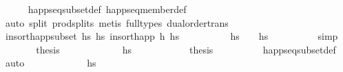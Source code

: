 \begin{isabellebody}
%
\isadelimproof
\ \ \ \ %
\endisadelimproof
%
\isatagproof
{}\isamarkupfalse%
\ happ{\isacharunderscore}{\kern0pt}seq{\isacharunderscore}{\kern0pt}subset{\isacharunderscore}{\kern0pt}def\ happ{\isacharunderscore}{\kern0pt}seq{\isacharunderscore}{\kern0pt}member{\isacharunderscore}{\kern0pt}def\isanewline
\ \ \ \ \isamarkupfalse%
\ {\isacharparenleft}{\kern0pt}auto\ split{\isacharcolon}{\kern0pt}\ prod{\isachardot}{\kern0pt}splits{\isacharparenright}{\kern0pt}\ {\isacharparenleft}{\kern0pt}metis\ {\isacharparenleft}{\kern0pt}full{\isacharunderscore}{\kern0pt}types{\isacharparenright}{\kern0pt}\ dual{\isacharunderscore}{\kern0pt}order{\isachardot}{\kern0pt}trans{\isacharparenright}{\kern0pt}%
\endisatagproof
{\isafoldproof}%
%
\isadelimproof
\isanewline
%
\endisadelimproof
\isanewline
\ \ \isamarkupfalse%
\ insort{\isacharunderscore}{\kern0pt}happ{\isacharunderscore}{\kern0pt}subset{\isacharcolon}{\kern0pt}\ {\isachardoublequoteopen}hs\ {\isasymsubseteq}\isactrlsub h\isactrlsub s\ insort{\isacharunderscore}{\kern0pt}happ\ h\ hs{\isachardoublequoteclose}\isanewline
%
\isadelimproof
\ \ %
\endisadelimproof
%
\isatagproof
{}\isamarkupfalse%
\ {\isacharminus}{\kern0pt}\isanewline
\ \ \ \ \isamarkupfalse%
\ {\isachardoublequoteopen}hs\ {\isacharequal}{\kern0pt}\ {\isacharbrackleft}{\kern0pt}{\isacharbrackright}{\kern0pt}\ {\isasymor}\ hs\ {\isasymnoteq}\ {\isacharbrackleft}{\kern0pt}{\isacharbrackright}{\kern0pt}{\isachardoublequoteclose}\isanewline
\ \ \ \ \ \ \isamarkupfalse%
\ simp\isanewline
\ \ \ \ \isamarkupfalse%
\ \isamarkupfalse%
\ {\isacharquery}{\kern0pt}thesis\isanewline
\ \ \ \ \isamarkupfalse%
\isanewline
\ \ \ \ \ \ \isamarkupfalse%
\ {\isachardoublequoteopen}hs\ {\isacharequal}{\kern0pt}\ {\isacharbrackleft}{\kern0pt}{\isacharbrackright}{\kern0pt}{\isachardoublequoteclose}\isanewline
\ \ \ \ \ \ \isamarkupfalse%
\ \isamarkupfalse%
\ {\isacharquery}{\kern0pt}thesis\isanewline
\ \ \ \ \ \ \ \ \isamarkupfalse%
\ happ{\isacharunderscore}{\kern0pt}seq{\isacharunderscore}{\kern0pt}subset{\isacharunderscore}{\kern0pt}def\ \isamarkupfalse%
\ auto\isanewline
\ \ \ \ \isamarkupfalse%
\isanewline
\ \ \ \ \ \ \isamarkupfalse%
\ {\isachardoublequoteopen}hs\ {\isasymnoteq}\ {\isacharbrackleft}{\kern0pt}{\isacharbrackright}{\kern0pt}{\isachardoublequoteclose}\isanewline

\end{isabellebody}

